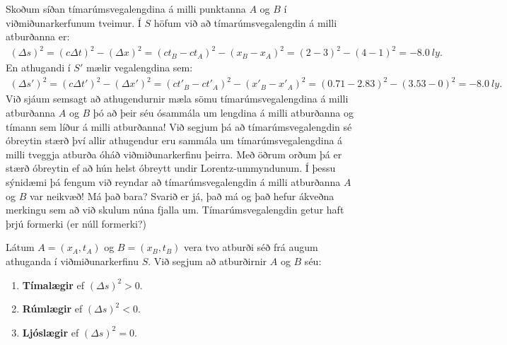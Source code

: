 \ifdefined \wholebook \else\documentclass[oneside]{book}\usepackage{EdlBook}\graphicspath{{figures/}}
\begin{document}
Skoðum síðan tímarúmsvegalengdina á milli punktanna $A$ og $B$ í viðmiðunarkerfunum tveimur. Í $S$ höfum við að tímarúmsvegalengdin á milli atburðanna er:
\begin{align*}
    (\Delta s)^2 = (c\Delta t)^2 - (\Delta x)^2 = (ct_B - ct_A)^2 - (x_B - x_A)^2 = (2-3)^2 - (4-1)^2 =  -\SI{8.0}{ly}.
\end{align*}
En athugandi í $S'$ mælir vegalengdina sem:
\begin{align*}
    (\Delta s')^2 = (c\Delta t')^2 - (\Delta x')^2 = (ct'_B - ct'_A)^2 - (x'_B - x'_A)^2 = (0.71-2.83)^2 - (3.53-0)^2 = -\SI{8.0}{ly}.
\end{align*}
Við sjáum semsagt að athugendurnir mæla sömu tímarúmsvegalengdina á milli atburðanna $A$ og $B$ þó að þeir séu ósammála um lengdina á milli atburðanna og tímann sem líður á milli atburðanna! Við segjum þá að tímarúmsvegalengdin sé óbreytin stærð því allir athugendur eru sammála um tímarúmsvegalengdina á milli tveggja atburða óháð viðmiðunarkerfinu þeirra. Með öðrum orðum þá er stærð óbreytin ef að hún helst óbreytt undir Lorentz-ummyndunum. Í þessu sýnidæmi þá fengum við reyndar að tímarúmsvegalengdin á milli atburðanna $A$ og $B$ var neikvæð! Má það bara? Svarið er já, það má og það hefur ákveðna merkingu sem að við skulum núna fjalla um. Tímarúmsvegalengdin getur haft þrjú formerki (er núll formerki?)

\begin{tcolorbox}
\begin{definition}
Látum $A = (x_A, t_A)$ og $B = (x_B, t_B)$ vera tvo atburði séð frá augum athuganda í viðmiðunarkerfinu $S$. Við segjum að atburðirnir $A$ og $B$ séu:
\begin{enumerate}[label = \textbf{(\roman*)}]
    \item \textbf{Tímalægir} ef $(\Delta s)^2 > 0$.
    \item \textbf{Rúmlægir} ef $(\Delta s)^2 < 0$.
    \item \textbf{Ljóslægir} ef $(\Delta s)^2 = 0$.
\end{enumerate}
\end{definition}
\end{tcolorbox}
\end{document}
